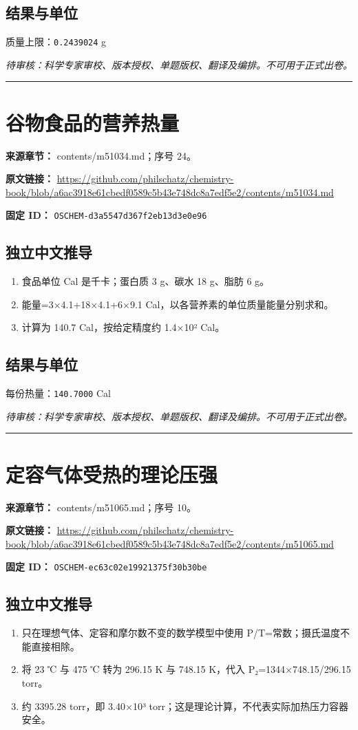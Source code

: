 \documentclass[UTF8,11pt,oneside,openany,fontset=none]{ctexbook}
\begin{document}
\subsection*{结果与单位}
\noindent 质量上限：\texttt{0.2439024} g\par
\noindent\textit{待审核：科学专家审校、版本授权、单题版权、翻译及编排。不可用于正式出卷。}
\medskip\hrule\medskip
\section{谷物食品的营养热量}
\noindent\textbf{来源章节：} contents/m51034.md；序号 24。\par
\noindent\textbf{原文链接：} \url{https://github.com/philschatz/chemistry-book/blob/a6ac3918e61cbedf0589c5b43e748dc8a7edf5e2/contents/m51034.md}\par
\noindent\textbf{固定 ID：} \texttt{OSCHEM-d3a5547d367f2eb13d3e0e96}\par
\subsection*{独立中文推导}
\begin{enumerate}
\item 食品单位 Cal 是千卡；蛋白质 3 g、碳水 18 g、脂肪 6 g。
\item 能量=3×4.1+18×4.1+6×9.1 Cal，以各营养素的单位质量能量分别求和。
\item 计算为 140.7 Cal，按给定精度约 1.4×10² Cal。
\end{enumerate}
\subsection*{结果与单位}
\noindent 每份热量：\texttt{140.7000} Cal\par
\noindent\textit{待审核：科学专家审校、版本授权、单题版权、翻译及编排。不可用于正式出卷。}
\medskip\hrule\medskip
\section{定容气体受热的理论压强}
\noindent\textbf{来源章节：} contents/m51065.md；序号 10。\par
\noindent\textbf{原文链接：} \url{https://github.com/philschatz/chemistry-book/blob/a6ac3918e61cbedf0589c5b43e748dc8a7edf5e2/contents/m51065.md}\par
\noindent\textbf{固定 ID：} \texttt{OSCHEM-ec63c02e19921375f30b30be}\par
\subsection*{独立中文推导}
\begin{enumerate}
\item 只在理想气体、定容和摩尔数不变的数学模型中使用 P/T=常数；摄氏温度不能直接相除。
\item 将 23 ℃ 与 475 ℃ 转为 296.15 K 与 748.15 K，代入 P₂=1344×748.15/296.15 torr。
\item 约 3395.28 torr，即 3.40×10³ torr；这是理论计算，不代表实际加热压力容器安全。
\end{enumerate}
\end{document}
